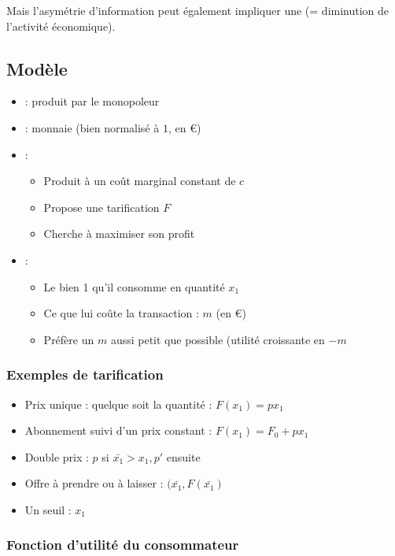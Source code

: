 Mais l'asymétrie d'information peut également impliquer une  (= diminution de l'activité économique).

\subsection{Modèle}

\begin{itemize}
\item {} : produit par le monopoleur
\item {} : monnaie (bien normalisé à $1$, en €)
\item {} :
	\begin{itemize}
	\item Produit à un coût marginal constant de $c$
	\item Propose une tarification $F$
	\item Cherche à maximiser son profit
	\end{itemize}
\item {} :
	\begin{itemize}
	\item Le bien 1 qu'il consomme en quantité $x_1$
	\item Ce que lui coûte la transaction : $m$ (en €)
	\item Préfère un $m$ aussi petit que possible (utilité croissante en $-m$
	\end{itemize}
\end{itemize}

\subsubsection{Exemples de tarification}

\begin{itemize}
\item Prix unique : quelque soit la quantité : $F(x_1) = px_1$
\item Abonnement suivi d'un prix constant : $F(x_1) = F_0 + px_1$
\item Double prix : $p$ si $\bar{x_1} > x_1, p'$ ensuite
\item Offre à prendre ou à laisser : $(\bar{x_1}, F(\bar{x_1})$
\item Un seuil : $x_1$
\end{itemize}

\subsubsection{Fonction d'utilité du consommateur}

